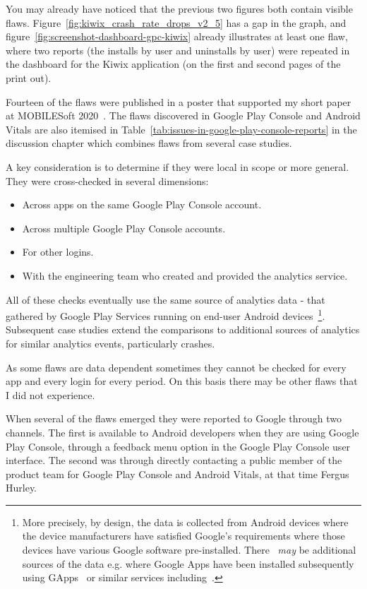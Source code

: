 You may already have noticed that the previous two figures both contain visible flaws. Figure~\ref{fig:kiwix_crash_rate_drops_v2_5} has a gap in the graph, and figure~\ref{fig:screenshot-dashboard-gpc-kiwix} already illustrates at least one flaw, where two reports (the installs by user and uninstalls by user) were repeated in the dashboard for the Kiwix application (on the first and second pages of the print out). 

Fourteen of the flaws were published in a poster that supported my short paper at MOBILESoft 2020~\citep{harty_improving_app_quality_despite_flawed_mobile_analytics}. The flaws discovered in Google Play Console and Android Vitals are also itemised in Table~\ref{tab:issues-in-google-play-console-reports} in the discussion chapter which combines flaws from several case studies.

A key consideration is to determine if they were local in scope or more general. They were cross-checked in several dimensions:
\begin{itemize}
    \item Across apps on the same Google Play Console account.
    \item Across multiple Google Play Console accounts.
    \item For other logins.
    \item With the engineering team who created and provided the analytics service. 
\end{itemize}

All of these checks eventually use the same source of analytics data - that gathered by Google Play Services running on end-user Android devices~\footnote{More precisely, by design, the data is collected from Android devices where the device manufacturers have satisfied Google's requirements where those devices have various Google software pre-installed. There ~\emph{may} be additional sources of the data e.g. where Google Apps have been installed subsequently using GApps~\citep{opengapps} or similar services including~\citep{nikgapps}.}.
%
Subsequent case studies extend the comparisons to additional sources of analytics for similar analytics events, particularly crashes.

As some flaws are data dependent sometimes they cannot be checked for every app and every login for every period. On this basis there may be other flaws that I did not experience.

When several of the flaws emerged they were reported to Google through two channels. The first is available to Android developers when they are using Google Play Console, through a feedback menu option in the Google Play Console user interface. The second was through directly contacting a public member of the product team for Google Play Console and Android Vitals, at that time Fergus Hurley. 

